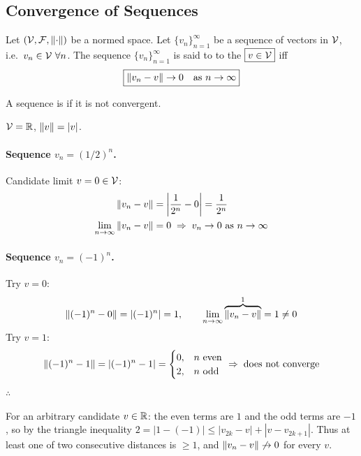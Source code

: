 \subsection{Convergence of Sequences}\label{ss:convergence}
\begin{definition}
Let $(\mathcal{V},\mathcal{F},\left\lVert \cdot \right\rVert)$ be a normed space. Let $\{v_n\}_{n=1}^\infty$ be a sequence of vectors in $\mathcal{V}$, i.e.\ $v_n\in\mathcal{V}\ \forall n$. The sequence $\{v_n\}_{n=1}^\infty$ is said to  to the  $\boxed{v\in\mathcal{V}}$ iff
\[
\boxed{\left\lVert v_n - v \right\rVert \to 0 \quad \text{as } n\to\infty}
\]
\end{definition}
\begin{remark}
A sequence is  if it is not convergent.
\end{remark}
\begin{example}
$\mathcal{V} = \mathbb{R}$, $\left\lVert v \right\rVert = |v|$.

\paragraph{Sequence $v_n = (1/2)^n$.} Candidate limit $v = 0 \in \mathcal{V}$:
\begin{align*}
\left\lVert v_n - v \right\rVert &= \left|\frac{1}{2^n} - 0\right| = \frac{1}{2^n}\\
\lim_{n\to\infty}\left\lVert v_n - v \right\rVert &= 0
\;\Rightarrow\; v_n \to 0 \text{ as } n\to\infty
\end{align*}

\paragraph{Sequence $v_n = (-1)^n$.} Try $v = 0$:
\[
\left\lVert (-1)^n - 0 \right\rVert = |(-1)^n| = 1, \qquad \lim_{n\to\infty}\overbrace{\left\lVert v_n - v \right\rVert}^{1} = 1 \neq 0
\]
Try $v = 1$:
\[
\left\lVert (-1)^n - 1 \right\rVert = \left\lvert (-1)^n - 1 \right\rvert = \begin{cases} 0, & n \text{ even}\\ 2, & n \text{ odd}\end{cases} \;\Rightarrow\; \text{does not converge}
\]
$\therefore$ 
\begin{insight}
For an arbitrary candidate $v\in\mathbb{R}$: the even terms are $1$ and the odd terms are $-1$, so by the triangle inequality $2 = |1-(-1)| \le |v_{2k}-v| + |v - v_{2k+1}|$. Thus at least one of two consecutive distances is $\ge 1$, and $\left\lVert v_n - v \right\rVert\not\to 0$ for every $v$.
\end{insight}
\end{example}

